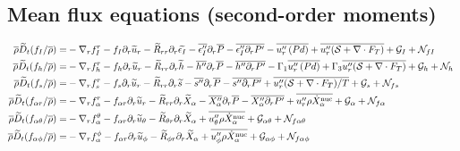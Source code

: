 \documentclass[10pt,paper=a4]{report}
\newcommand{\eht}{\overline}
\newcommand{\fht}{\widetilde}
\newcommand{\fav}{\widetilde}
\def\erho{\eht{\rho}}
\begin{document}
\newpage

\subsection{Mean flux equations (second-order moments)}

\begin{table}[!h]
\begin{align}
\erho \fav{D}_t (f_I / \eht{\rho}) = &  -\nabla_r f_I^r  - f_I \partial_r \fht{u}_r  - \fht{R}_{rr} \partial_r \fht{\epsilon_I} - \eht{\epsilon''_I} \partial_r \eht{P} - \eht{\epsilon''_I \partial_r P'}  - \eht{u''_r \left( P d \right)}  + \overline{u''_r ({\mathcal S} + \nabla \cdot F_T)} + {\mathcal G_I} +  {\mathcal N_{fI}} \label{eq:rans_fi} \\
\erho \fav{D}_t (f_h / \eht{\rho}) = &  -\nabla_r f_h^r - f_h \partial_r \fht{u}_r - \fht{R}_{rr} \partial_r \fht{h} -\eht{h''}\partial_r \eht{P} - \eht{h''\partial_r P'} - \Gamma_1\eht{u''_r \left( P d \right) } + \Gamma_3 \overline{u''_r ({\mathcal S} + \nabla \cdot F_T)} + {\mathcal G_h} + {\mathcal N_{h \ }} \label{eq:rans_fh} \\
\erho \fav{D}_t (f_s / \eht{\rho}) = & -\nabla_r f_s^r - f_s \partial_r \fht{u}_r - \fht{R}_{rr} \partial_r \fht{s} -\eht{s''}\partial_r \eht{P} - \eht{s''\partial_r P'} + \eht{u''_r ( {\mathcal S} + \nabla \cdot F_T)  / T} + {\mathcal G_s} + {\mathcal N_{fs}}  \label{eq:rans_fs} \\
\erho \fav{D}_t (f_{\alpha r} / \eht{\rho}) = &  -\nabla_r f_\alpha^r  - f_{\alpha r} \partial_r \fht{u}_r - \fht{R}_{rr} \partial_r \fht{X}_\alpha -\eht{X''_\alpha} \partial_r \eht{P} - \eht{X''_\alpha \partial_r P'} + \overline{u''_r \rho \dot{X}_\alpha^{\rm nuc}} + {\mathcal G_\alpha} + {\mathcal N_{f\alpha}}  \label{eq:rans_falphar} \\
\erho \fav{D}_t (f_{\alpha \theta} / \eht{\rho}) = &  -\nabla_r f_\alpha^\theta  - f_{\alpha r} \partial_r \fht{u}_\theta - \fht{R}_{\theta r} \partial_r \fht{X}_\alpha + \overline{u''_\theta \rho \dot{X}_\alpha^{\rm nuc}} + {\mathcal G_{\alpha \theta}} + {\mathcal N_{f\alpha \theta}}  \label{eq:rans_falphat} \\
\erho \fav{D}_t (f_{\alpha \phi} / \eht{\rho}) = &  -\nabla_r f_\alpha^\phi  - f_{\alpha r} \partial_r \fht{u}_\phi - \fht{R}_{\phi r} \partial_r \fht{X}_\alpha + \overline{u''_\phi \rho \dot{X}_\alpha^{\rm nuc}} + {\mathcal G_{\alpha \phi}} + {\mathcal N_{f\alpha \phi}}  \label{eq:rans_falphap} \\

\end{align}
\end{table}
\end{document}
